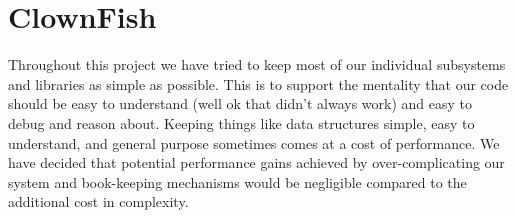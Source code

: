 \chapter{ClownFish}\label{c:clownfish}

Throughout this project we have tried to keep most of our individual subsystems 
and libraries as simple as possible. This is to support the mentality that our 
code should be easy to understand (well ok that didn't always work) and easy to 
debug and reason about. Keeping things like data structures simple, easy to 
understand, and general purpose sometimes comes at a cost of performance. We 
have decided that potential performance gains achieved by over-complicating our 
system and book-keeping mechanisms would be negligible compared to the 
additional cost in complexity.







